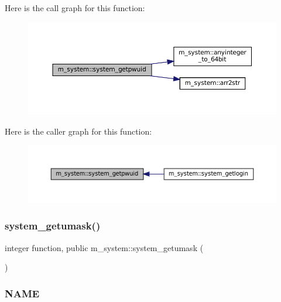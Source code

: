 Here is the call graph for this function\+:\nopagebreak
\begin{figure}[H]
\begin{center}
\leavevmode
\includegraphics[width=350pt]{namespacem__system_a59cd13de95dc9a65b444f02614ea39ce_cgraph}
\end{center}
\end{figure}
Here is the caller graph for this function\+:\nopagebreak
\begin{figure}[H]
\begin{center}
\leavevmode
\includegraphics[width=350pt]{namespacem__system_a59cd13de95dc9a65b444f02614ea39ce_icgraph}
\end{center}
\end{figure}
\mbox{\label{namespacem__system_aa9ca951be39d2ea738d627cf42c00ddd}} 
\subsubsection{\texorpdfstring{system\+\_\+getumask()}{system\_getumask()}}
{\footnotesize\ttfamily integer function, public m\+\_\+system\+::system\+\_\+getumask (\begin{DoxyParamCaption}{ }\end{DoxyParamCaption})}



\subsubsection*{N\+A\+ME}

